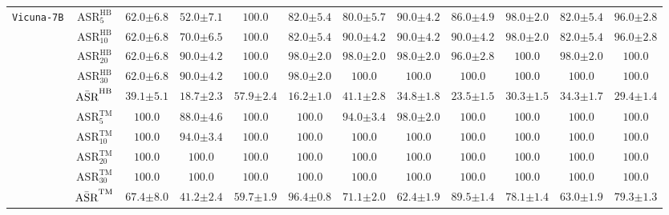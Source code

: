 \begin{table*}[t]
{\begin{tabular}{c|c||c|c|c||c|c|c|c||c|c|c}
\hline
\multirow{11}{*}{\texttt{Vicuna-7B}} 
& $\text{ASR}^{\text{HB}}_{5}$ & $62.0{\pm 6.8}$ & $52.0{\pm 7.1}$ & $\mathbf{100.0}$ & $82.0{\pm 5.4}$ & $80.0{\pm 5.7}$ & $90.0{\pm 4.2}$ & $86.0{\pm 4.9}$ & $98.0{\pm 2.0}$ & $82.0{\pm 5.4}$ & $96.0{\pm 2.8}$ \\
& $\text{ASR}^{\text{HB}}_{10}$ & $62.0{\pm 6.8}$ & $70.0{\pm 6.5}$ & $\mathbf{100.0}$ & $82.0{\pm 5.4}$ & $90.0{\pm 4.2}$ & $90.0{\pm 4.2}$ & $90.0{\pm 4.2}$ & $98.0{\pm 2.0}$ & $82.0{\pm 5.4}$ & $96.0{\pm 2.8}$ \\
& $\text{ASR}^{\text{HB}}_{20}$ & $62.0{\pm 6.8}$ & $90.0{\pm 4.2}$ & $\mathbf{100.0}$ & $98.0{\pm 2.0}$ & $98.0{\pm 2.0}$ & $98.0{\pm 2.0}$ & $96.0{\pm 2.8}$ & $\mathbf{100.0}$ & $98.0{\pm 2.0}$ & $\mathbf{100.0}$ \\
& $\text{ASR}^{\text{HB}}_{30}$ & $62.0{\pm 6.8}$ & $90.0{\pm 4.2}$ & $\mathbf{100.0}$ & $98.0{\pm 2.0}$ & $\mathbf{100.0}$ & $\mathbf{100.0}$ & $\mathbf{100.0}$ & $\mathbf{100.0}$ & $\mathbf{100.0}$ & $\mathbf{100.0}$ \\
& $\Bar{\text{ASR}}^{\text{HB}}$ & $39.1{\pm 5.1}$ & $18.7{\pm 2.3}$ & $\mathbf{57.9{\pm 2.4}}$ & $16.2{\pm 1.0}$ & $41.1{\pm 2.8}$ & $34.8{\pm 1.8}$ & $23.5{\pm 1.5}$ & $30.3{\pm 1.5}$ & $34.3{\pm 1.7}$ & $29.4{\pm 1.4}$ \\
\cline{2-12}
& $\text{ASR}^{\text{TM}}_{5}$ & $\mathbf{100.0}$ & $88.0{\pm 4.6}$ & $\mathbf{100.0}$ & $\mathbf{100.0}$ & $94.0{\pm 3.4}$ & $98.0{\pm 2.0}$ & $\mathbf{100.0}$ & $\mathbf{100.0}$ & $\mathbf{100.0}$ & $\mathbf{100.0}$ \\
& $\text{ASR}^{\text{TM}}_{10}$ & $\mathbf{100.0}$ & $94.0{\pm 3.4}$ & $\mathbf{100.0}$ & $\mathbf{100.0}$ & $\mathbf{100.0}$ & $\mathbf{100.0}$ & $\mathbf{100.0}$ & $\mathbf{100.0}$ & $\mathbf{100.0}$ & $\mathbf{100.0}$ \\
& $\text{ASR}^{\text{TM}}_{20}$ & $\mathbf{100.0}$ & $\mathbf{100.0}$ & $\mathbf{100.0}$ & $\mathbf{100.0}$ & $\mathbf{100.0}$ & $\mathbf{100.0}$ & $\mathbf{100.0}$ & $\mathbf{100.0}$ & $\mathbf{100.0}$ & $\mathbf{100.0}$ \\
& $\text{ASR}^{\text{TM}}_{30}$ & $\mathbf{100.0}$ & $\mathbf{100.0}$ & $\mathbf{100.0}$ & $\mathbf{100.0}$ & $\mathbf{100.0}$ & $\mathbf{100.0}$ & $\mathbf{100.0}$ & $\mathbf{100.0}$ & $\mathbf{100.0}$ & $\mathbf{100.0}$ \\
& $\Bar{\text{ASR}}^{\text{TM}}$ & $67.4{\pm 8.0}$ & $41.2{\pm 2.4}$ & $59.7{\pm 1.9}$ & $\mathbf{96.4{\pm 0.8}}$ & $71.1{\pm 2.0}$ & $62.4{\pm 1.9}$ & $89.5{\pm 1.4}$ & $78.1{\pm 1.4}$ & $63.0{\pm 1.9}$ & $79.3{\pm 1.3}$ \\

\end{tabular}}
\end{table*}
